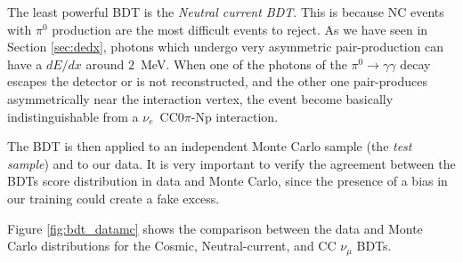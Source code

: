 The least powerful BDT is the \emph{Neutral current BDT}. This is because NC events with $\pi^0$ production are the most difficult events to reject. As we have seen in Section \ref{sec:dedx}, photons which undergo very asymmetric pair-production can have a $dE/dx$ around $2$~MeV. When one of the photons of the $\pi^0\rightarrow\gamma\gamma$ decay escapes the detector or is not reconstructed, and the other one pair-produces asymmetrically near the interaction vertex, the event become basically indistinguishable from a $\nu_e$~CC0$\pi$-Np interaction.

The BDT is then applied to an independent Monte Carlo sample (the \emph{test sample}) and to our data. It is very important to verify the agreement between the BDTs score distribution in data and Monte Carlo, since the presence of a bias in our training could create a fake excess.

Figure \ref{fig:bdt_datamc} shows the comparison between the data and Monte Carlo distributions for the Cosmic, Neutral-current, and CC $\nu_{\mu}$ BDTs. 

